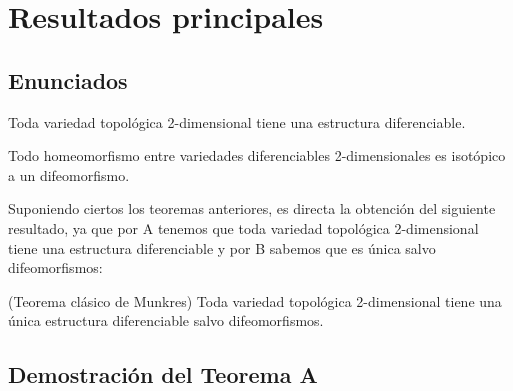 
\chapter{Resultados principales}

\section{Enunciados}
	\begin{teora}
		Toda variedad topológica 2-dimensional tiene una estructura diferenciable.
	\end{teora}

	\begin{teorb}
		Todo homeomorfismo entre variedades diferenciables 2-dimensionales es isotópico a un difeomorfismo.
	\end{teorb}
	
	Suponiendo ciertos los teoremas anteriores, es directa la obtención del siguiente resultado, ya que por A tenemos que toda variedad topológica 2-dimensional tiene una estructura diferenciable y por B sabemos que es única salvo difeomorfismos:
	
	\begin{corolario} (Teorema clásico de Munkres)
		Toda variedad topológica 2-dimensional tiene una única estructura diferenciable salvo difeomorfismos.
	\end{corolario}

\section{Demostración del Teorema A}

